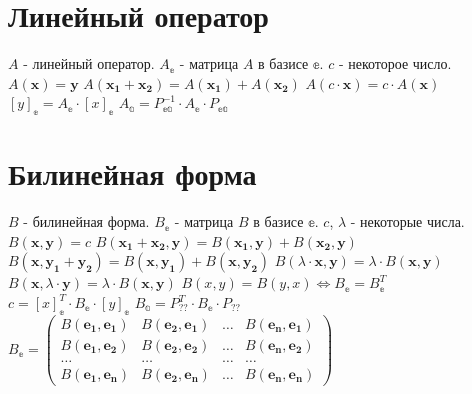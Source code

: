 \section{Линейный оператор}
$A$ - линейный оператор.
$A_\mathbb{e}$ - матрица $A$ в базисе $\mathbb{e}$.
$c$ - некоторое число.
$\displaystyle A(\boldsymbol{x}) = \boldsymbol{y} $
$\displaystyle A(\boldsymbol{x_1} + \boldsymbol{x_2}) = A(\boldsymbol{x_1}) + A(\boldsymbol{x_2}) $
$\displaystyle A(c\cdot\boldsymbol{x}) = c\cdot A(\boldsymbol{x}) $
$\displaystyle [y]_\mathbb{e} = A_\mathbb{e} \cdot [x]_\mathbb{e} $
$\displaystyle A_\mathbb{a} = P_\mathbb{ea}^{-1} \cdot A_\mathbb{e} \cdot P_\mathbb{ea} $
\section{Билинейная форма}
$B$ - билинейная форма.
$B_\mathbb{e}$ - матрица $B$ в базисе $\mathbb{e}$.
$c$, $\lambda$ - некоторые числа.
$\displaystyle B(\boldsymbol{x}, \boldsymbol{y}) = c$
$\displaystyle B(\boldsymbol{x_1} + \boldsymbol{x_2}, \boldsymbol{y}) = B(\boldsymbol{x_1}, \boldsymbol{y}) + B(\boldsymbol{x_2}, \boldsymbol{y}) $
$\displaystyle B(\boldsymbol{x}, \boldsymbol{y_1} + \boldsymbol{y_2}) = B(\boldsymbol{x}, \boldsymbol{y_1}) + B(\boldsymbol{x}, \boldsymbol{y_2}) $
$\displaystyle B(\lambda\cdot \boldsymbol{x}, \boldsymbol{y}) =  \lambda\cdot B(\boldsymbol{x}, \boldsymbol{y})$
$\displaystyle B(\boldsymbol{x}, \lambda\cdot \boldsymbol{y}) =  \lambda\cdot B(\boldsymbol{x}, \boldsymbol{y})$
$\displaystyle B(x, y) = B(y, x) \Leftrightarrow B_\mathbb{e} = B_\mathbb{e}^T $
$\displaystyle c = [x]_\mathbb{e}^T \cdot B_\mathbb{e} \cdot [y]_\mathbb{e} $
$\displaystyle B_\mathbb{a} = P_\mathbb{??}^T \cdot B_\mathbb{e} \cdot P_\mathbb{??} $
$\displaystyle
B_\mathbb{e} =
\begin{pmatrix}
	B(\boldsymbol{e_1},\boldsymbol{e_1})& B(\boldsymbol{e_2},\boldsymbol{e_1})& \ldots& B(\boldsymbol{e_n},\boldsymbol{e_1})\\
	B(\boldsymbol{e_1},\boldsymbol{e_2})& B(\boldsymbol{e_2},\boldsymbol{e_2})& \ldots& B(\boldsymbol{e_n},\boldsymbol{e_2})\\
	\ldots& \ldots& \ldots& \ldots\\
	B(\boldsymbol{e_1},\boldsymbol{e_n})& B(\boldsymbol{e_2},\boldsymbol{e_n})& \ldots& B(\boldsymbol{e_n},\boldsymbol{e_n})
\end{pmatrix}
$
